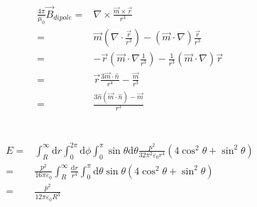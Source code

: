 \documentclass[10pt,fleqn]{article}
\newcommand{\ud}{\mathrm{d}}
\newcommand{\eqar}[1]
{
  \begin{align*}
    #1
  \end{align*}
}
\newcommand{\paren}[1]{{\left({#1}\right)}}
\begin{document}
\subsection{}
\eqar{
  \frac{4\pi}{\mu_0}\vec B_{dipole}=&\nabla\times\frac{\vec m\times\vec r}{r^3}\\
  =&\vec m\paren{\nabla\cdot\frac{\vec r}{r^3}}-
  \paren{\vec m\cdot\nabla}\frac{\vec r}{r^3}\\
  =&-\vec r\paren{\vec m\cdot\nabla\frac{1}{r^3}}
  -\frac{1}{r^3}\paren{\vec m\cdot\nabla}\vec r\\
  =&\vec r\frac{3\vec m\cdot\hat n}{r^4}-\frac{\vec m}{r^3}\\
  =&\frac{3\hat n\paren{\vec m\cdot\hat n}-\vec m}{r^3}
}
\section{}
\subsection{}
\eqar{
  E=&\int_R^\infty\ud r\int_0^{2\pi}\ud\phi\int_{0}^{\pi}\sin\theta\ud\theta\frac{p^2}{32\pi^2\varepsilon_0r^4}\paren{4\cos^2\theta+\sin^2\theta}\\
  =&\frac{p^2}{16\pi\varepsilon_0}\int_R^\infty\frac{\ud r}{r^4}\int_{0}^{\pi}\ud\theta\sin\theta\paren{4\cos^2\theta+\sin^2\theta}\\
  =&\frac{p^2}{12\pi\varepsilon_0 R^3}
}
\end{document}
